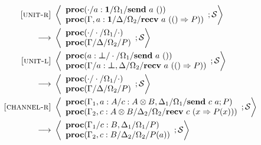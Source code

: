 \documentclass[12pt, openany]{memoir}
\newcommand*{\send}[2]{\textbf{send}\ #1\ #2}
\newcommand*{\recv}[2]{\textbf{recv}\ #1\ #2}
\newcommand*{\procObj}[4]{\textbf{proc}(#1/#2/#3/#4)}
\newcommand*{\cancelSet}[0]{\mathcal{S}}
\begin{document}
\begin{figure}[H]
  \begin{alignat}{2}
    \label{unit-reduction-r} \textsc{[unit-r]} & ~ 
    \Braket{
      \begin{array}{l}
        \procObj{\cdot}{a : \textbf{1}}{\Omega_1}{\send{a}{()}} \\
        \procObj{\Gamma, a : \textbf{1}}{\Delta}{\Omega_2}{\recv{a}{(() \Rightarrow P)}}
      \end{array}
      ; \cancelSet
    } \tag*{} \\ ~ \longrightarrow & ~ 
    \Braket{
      \begin{array}{l}
        \procObj{\cdot}{\cdot}{\Omega_1}{\cdot} \\
        \procObj{\Gamma}{\Delta}{\Omega_2}{P}
      \end{array}
      ; \cancelSet
    } \tag*{} \\
    \label{unit-reduction-l} \textsc{[unit-l]} & ~ 
    \Braket{
      \begin{array}{l}
        \procObj{a : \boldsymbol{\bot}}{\cdot}{\Omega_1}{\send{a}{()}} \\
        \procObj{\Gamma}{a : \boldsymbol{\bot}, \Delta}{\Omega_2}{\recv{a}{(() \Rightarrow P)}}
      \end{array}
      ; \cancelSet
    } \tag*{} \\ ~ \longrightarrow & ~ 
    \Braket{
      \begin{array}{l}
        \procObj{\cdot}{\cdot}{\Omega_1}{\cdot} \\
        \procObj{\Gamma}{\Delta}{\Omega_2}{P}
      \end{array}
      ; \cancelSet
    } \tag*{} \\
    \label{channel-reduction-r} \textsc{[channel-r]} & ~ 
    \Braket{
      \begin{array}{l}
        \procObj{\Gamma_1, a : A}{c : A\otimes B, \Delta_1}{\Omega_1}{\send{c}{a}; P} \\
        \procObj{\Gamma_2, c : A \otimes B}{\Delta_2}{\Omega_2}{\recv{c}{(x \Rightarrow P(x))}}
      \end{array}
      ; \cancelSet
    } \tag*{} \\ ~ \longrightarrow & ~ 
    \Braket{
      \begin{array}{l}
        \procObj{\Gamma_1}{c : B, \Delta_1}{\Omega_1}{P} \\
        \procObj{\Gamma_2, c : B}{\Delta_2}{\Omega_2}{P(a)}
      \end{array}
      ; \cancelSet 
}
\end{alignat}
\end{figure}
\end{document}
